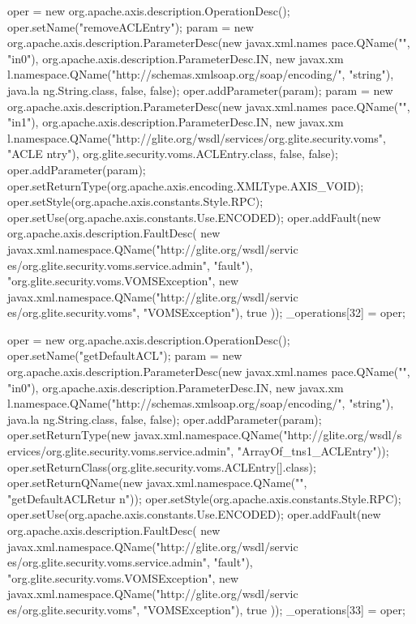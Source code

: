 \begin{DoxyCode}
{        oper = new org.apache.axis.description.OperationDesc();
        oper.setName("removeACLEntry");
        param = new org.apache.axis.description.ParameterDesc(new javax.xml.names
      pace.QName("", "in0"), org.apache.axis.description.ParameterDesc.IN, new javax.xm
      l.namespace.QName("http://schemas.xmlsoap.org/soap/encoding/", "string"), java.la
      ng.String.class, false, false);
        oper.addParameter(param);
        param = new org.apache.axis.description.ParameterDesc(new javax.xml.names
      pace.QName("", "in1"), org.apache.axis.description.ParameterDesc.IN, new javax.xm
      l.namespace.QName("http://glite.org/wsdl/services/org.glite.security.voms", "ACLE
      ntry"), org.glite.security.voms.ACLEntry.class, false, false);
        oper.addParameter(param);
        oper.setReturnType(org.apache.axis.encoding.XMLType.AXIS_VOID);
        oper.setStyle(org.apache.axis.constants.Style.RPC);
        oper.setUse(org.apache.axis.constants.Use.ENCODED);
        oper.addFault(new org.apache.axis.description.FaultDesc(
                      new javax.xml.namespace.QName("http://glite.org/wsdl/servic
      es/org.glite.security.voms.service.admin", "fault"),
                      "org.glite.security.voms.VOMSException",
                      new javax.xml.namespace.QName("http://glite.org/wsdl/servic
      es/org.glite.security.voms", "VOMSException"), 
                      true
                     ));
        _operations[32] = oper;

        oper = new org.apache.axis.description.OperationDesc();
        oper.setName("getDefaultACL");
        param = new org.apache.axis.description.ParameterDesc(new javax.xml.names
      pace.QName("", "in0"), org.apache.axis.description.ParameterDesc.IN, new javax.xm
      l.namespace.QName("http://schemas.xmlsoap.org/soap/encoding/", "string"), java.la
      ng.String.class, false, false);
        oper.addParameter(param);
        oper.setReturnType(new javax.xml.namespace.QName("http://glite.org/wsdl/s
      ervices/org.glite.security.voms.service.admin", "ArrayOf_tns1_ACLEntry"));
        oper.setReturnClass(org.glite.security.voms.ACLEntry[].class);
        oper.setReturnQName(new javax.xml.namespace.QName("", "getDefaultACLRetur
      n"));
        oper.setStyle(org.apache.axis.constants.Style.RPC);
        oper.setUse(org.apache.axis.constants.Use.ENCODED);
        oper.addFault(new org.apache.axis.description.FaultDesc(
                      new javax.xml.namespace.QName("http://glite.org/wsdl/servic
      es/org.glite.security.voms.service.admin", "fault"),
                      "org.glite.security.voms.VOMSException",
                      new javax.xml.namespace.QName("http://glite.org/wsdl/servic
      es/org.glite.security.voms", "VOMSException"), 
                      true
                     ));
        _operations[33] = oper;

}
\end{DoxyCode}
